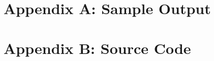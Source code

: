 \documentclass[twocolumn,10pt]{asme2ej}
\begin{document}








\onecolumn
\appendix       %
\section*{Appendix A: Sample Output}



\section*{Appendix B: Source Code}



\clearpage






%

%

%

\end{document}
